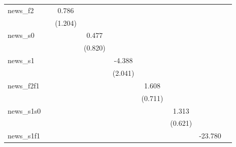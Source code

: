 {\begin{tabular}{l*{8}{c}}
\addlinespace
news\_f2     &                     &       0.786         &                     &                     &                     &                     &                     &                     \\
            &                     &     (1.204)         &                     &                     &                     &                     &                     &                     \\
\addlinespace
news\_s0     &                     &                     &       0.477         &                     &                     &                     &                     &                     \\
            &                     &                     &     (0.820)         &                     &                     &                     &                     &                     \\
\addlinespace
news\_s1     &                     &                     &                     &      -4.388\sym{**} &                     &                     &                     &                     \\
            &                     &                     &                     &     (2.041)         &                     &                     &                     &                     \\
\addlinespace
news\_f2f1   &                     &                     &                     &                     &       1.608\sym{**} &                     &                     &                     \\
            &                     &                     &                     &                     &     (0.711)         &                     &                     &                     \\
\addlinespace
news\_s1s0   &                     &                     &                     &                     &                     &       1.313\sym{**} &                     &                     \\
            &                     &                     &                     &                     &                     &     (0.621)         &                     &                     \\
\addlinespace
news\_s1f1   &                     &                     &                     &                     &                     &                     &     -23.780         &                     \\

\end{tabular}}
